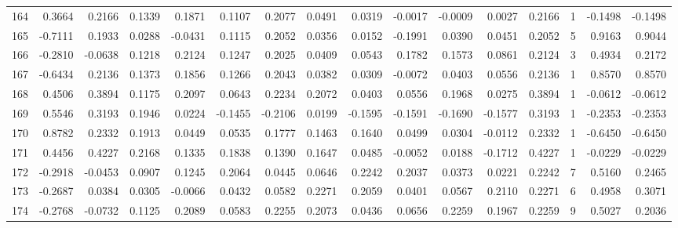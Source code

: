 \begin{tabular}{lrrrrrrrrrrrrrrr}
164 &      0.3664 &  0.2166 &  0.1339 &  0.1871 &  0.1107 &  0.2077 &  0.0491 &  0.0319 & -0.0017 & -0.0009 &   0.0027 &     0.2166 &      1 &                   -0.1498 &                    -0.1498 \\
165 &     -0.7111 &  0.1933 &  0.0288 & -0.0431 &  0.1115 &  0.2052 &  0.0356 &  0.0152 & -0.1991 &  0.0390 &   0.0451 &     0.2052 &      5 &                    0.9163 &                     0.9044 \\
166 &     -0.2810 & -0.0638 &  0.1218 &  0.2124 &  0.1247 &  0.2025 &  0.0409 &  0.0543 &  0.1782 &  0.1573 &   0.0861 &     0.2124 &      3 &                    0.4934 &                     0.2172 \\
167 &     -0.6434 &  0.2136 &  0.1373 &  0.1856 &  0.1266 &  0.2043 &  0.0382 &  0.0309 & -0.0072 &  0.0403 &   0.0556 &     0.2136 &      1 &                    0.8570 &                     0.8570 \\
168 &      0.4506 &  0.3894 &  0.1175 &  0.2097 &  0.0643 &  0.2234 &  0.2072 &  0.0403 &  0.0556 &  0.1968 &   0.0275 &     0.3894 &      1 &                   -0.0612 &                    -0.0612 \\
169 &      0.5546 &  0.3193 &  0.1946 &  0.0224 & -0.1455 & -0.2106 &  0.0199 & -0.1595 & -0.1591 & -0.1690 &  -0.1577 &     0.3193 &      1 &                   -0.2353 &                    -0.2353 \\
170 &      0.8782 &  0.2332 &  0.1913 &  0.0449 &  0.0535 &  0.1777 &  0.1463 &  0.1640 &  0.0499 &  0.0304 &  -0.0112 &     0.2332 &      1 &                   -0.6450 &                    -0.6450 \\
171 &      0.4456 &  0.4227 &  0.2168 &  0.1335 &  0.1838 &  0.1390 &  0.1647 &  0.0485 & -0.0052 &  0.0188 &  -0.1712 &     0.4227 &      1 &                   -0.0229 &                    -0.0229 \\
172 &     -0.2918 & -0.0453 &  0.0907 &  0.1245 &  0.2064 &  0.0445 &  0.0646 &  0.2242 &  0.2037 &  0.0373 &   0.0221 &     0.2242 &      7 &                    0.5160 &                     0.2465 \\
173 &     -0.2687 &  0.0384 &  0.0305 & -0.0066 &  0.0432 &  0.0582 &  0.2271 &  0.2059 &  0.0401 &  0.0567 &   0.2110 &     0.2271 &      6 &                    0.4958 &                     0.3071 \\
174 &     -0.2768 & -0.0732 &  0.1125 &  0.2089 &  0.0583 &  0.2255 &  0.2073 &  0.0436 &  0.0656 &  0.2259 &   0.1967 &     0.2259 &      9 &                    0.5027 &                     0.2036 \\

\end{tabular}
